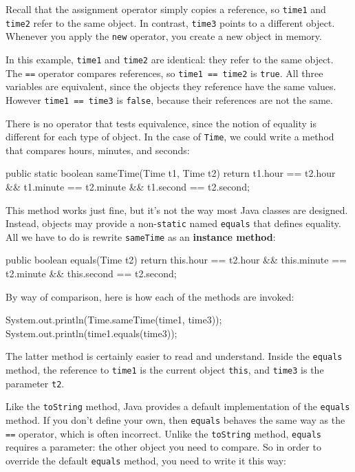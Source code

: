 \documentclass[12pt]{book}
\theoremstyle{exercise}
\newcommand{\java}[1]{\verb"#1"}
\newcommand{\java}[1]{\lstinline{#1}} %
\begin{document}
Recall that the assignment operator simply copies a reference, so \java{time1} and \java{time2} refer to the same object.
In contrast, \java{time3} points to a different object.
Whenever you apply the \java{new} operator, you create a new object in memory.

In this example, \java{time1} and \java{time2} are identical: they refer to the same object.
The \java{==} operator compares references, so \java{time1 == time2} is \java{true}.
All three variables are equivalent, since the objects they reference have the same values.
However \java{time1 == time3} is \java{false}, because their references are not the same.

There is no operator that tests equivalence, since the notion of equality is different for each type of object.
In the case of \java{Time}, we could write a method that compares hours, minutes, and seconds:

\begin{code}
    public static boolean sameTime(Time t1, Time t2) {
        return t1.hour == t2.hour
            && t1.minute == t2.minute
            && t1.second == t2.second;
    }
\end{code}


This method works just fine, but it's not the way most Java classes are designed.
Instead, objects may provide a non-\java{static} named \java{equals} that defines equality.
All we have to do is rewrite \java{sameTime} as an {\bf instance method}:

\begin{code}
    public boolean equals(Time t2) {
        return this.hour == t2.hour
            && this.minute == t2.minute
            && this.second == t2.second;
    }
\end{code}

By way of comparison, here is how each of the methods are invoked:

\begin{code}
    System.out.println(Time.sameTime(time1, time3));
    System.out.println(time1.equals(time3));
\end{code}

The latter method is certainly easier to read and understand.
Inside the \java{equals} method, the reference to \java{time1} is the current object \java{this}, and \java{time3} is the parameter \java{t2}.

Like the \java{toString} method, Java provides a default implementation of the \java{equals} method.
If you don't define your own, then \java{equals} behaves the same way as the \java{==} operator, which is often incorrect.
Unlike the \java{toString} method, \java{equals} requires a parameter: the other object you need to compare.
So in order to override the default \java{equals} method, you need to write it this way:
\end{document}
